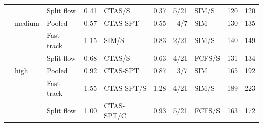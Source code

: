\begin{tabular}{lllrlrr lrr}
 &  & Split flow & 0.41 & CTAS/S & 0.37 & 5/21 & SIM/S & 120 & 120 \\
\addlinespace[1pt]
 & medium & Pooled & 0.57 & CTAS-SPT & 0.55 & 4/7 & SIM & 130 & 135 \\
 &  & Fast track & 1.15 & SIM/S & 0.83 & 2/21 & SIM/S & 140 & 149 \\
 &  & Split flow & 0.68 & CTAS/S & 0.63 & 4/21 & FCFS/S & 131 & 134 \\
\addlinespace[1pt]
 & high & Pooled & 0.92 & CTAS-SPT & 0.87 & 3/7 & SIM & 165 & 192 \\
 &  & Fast track & 1.55 & CTAS-SPT/S & 1.28 & 4/21 & SIM/S & 189 & 223 \\
 &  & Split flow & 1.00 & CTAS-SPT/C & 0.93 & 5/21 & FCFS/S & 163 & 172 \\
\bottomrule
\end{tabular}
